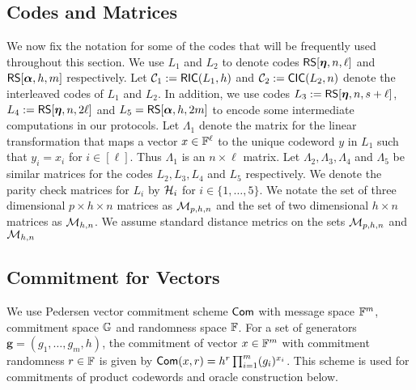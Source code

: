 \subsection{Codes and Matrices}\label{sec:codesandmatrices}
We now fix the notation for some of the codes that will be
frequently used throughout this section. We use $L_1$ and $L_2$ to denote codes
$\mathsf{RS}[\bm{\eta},n,\ell]$ and $\mathsf{RS}[\bm{\alpha},h,m]$ respectively. Let $\mathcal{C}_1 := \mathsf{RIC}(L_1,h)$ 
and $\mathcal{C}_2 :=\mathsf{CIC}(L_2,n)$ denote the interleaved codes of $L_1$ and $L_2$. In addition, 
we use codes $L_3 := \mathsf{RS}[\bm{\eta},n,s+\ell]$, $L_4 := \mathsf{RS}[\bm{\eta},n,2\ell]$ and 
$L_5=\mathsf{RS}[\bm{\alpha},h,2m]$ to encode some intermediate computations in our protocols.
Let $\Lambda_1$ denote the matrix for the linear transformation that maps a vector $x\in \mathbb{F}^\ell$ 
to the unique codeword $y$ in $L_1$ such that $y_i=x_i$ for $i\in [\ell]$. Thus $\Lambda_1$ is 
an $n\times \ell$ matrix. Let $\Lambda_2,\Lambda_3,\Lambda_4$ and $\Lambda_5$ be similar matrices
for the codes $L_2,L_3,L_4$ and $L_5$ respectively. We denote the
parity check matrices for $L_i$  by $\mathcal{H}_i$ for $i\in \{1,\ldots,5\}$. 
We notate the set of three dimensional $p\times h\times n$ matrices as $\mathcal{M}_{p,h,n}$ and
the set of two dimensional $h\times n$ matrices as $\mathcal{M}_{h, n}$. We
assume standard distance metrics on the sets $\mathcal{M}_{p,h,n}$ and $\mathcal{M}_{h,n}$

\subsection{Commitment for Vectors}
We use Pedersen vector commitment scheme $\mathsf{Com}$ with message space $\mathbb{F}^m$,
commitment space $\mathbb{G}$ and randomness space $\mathbb{F}$. For a set of generators
$\bm{g}=(g_1,\ldots,g_m,h)$, the commitment of vector $x\in \mathbb{F}^m$ with commitment
randomness $r\in \mathbb{F}$ is given by $\mathsf{Com}(x,r)=h^r \prod_{i=1}^m (g_i)^{x_i} $. This scheme is used for commitments of  product codewords and oracle construction below.

